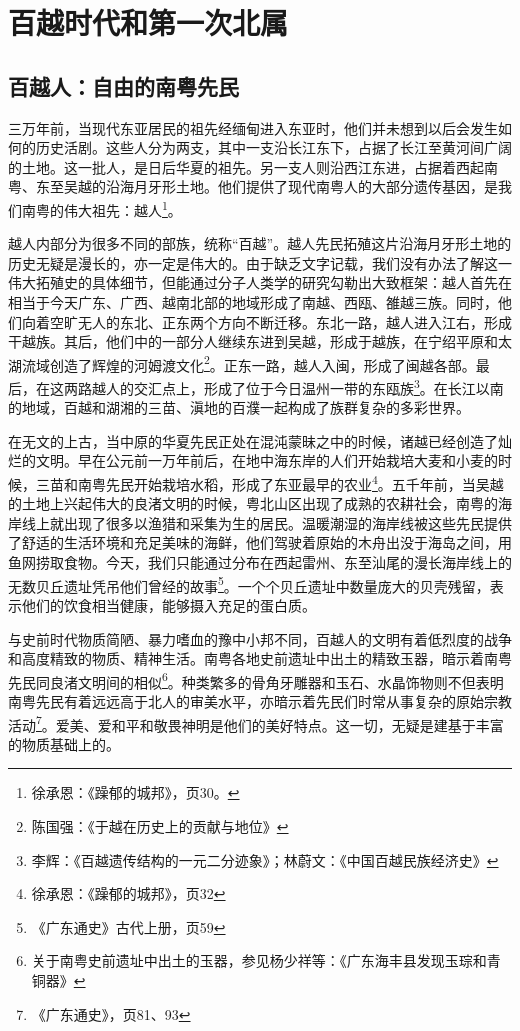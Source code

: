 \chapter{百越时代和第一次北属}

\section{百越人：自由的南粤先民}

三万年前，当现代东亚居民的祖先经缅甸进入东亚时，他们并未想到以后会发生如何的历史活剧。这些人分为两支，其中一支沿长江东下，占据了长江至黄河间广阔的土地。这一批人，是日后华夏的祖先。另一支人则沿西江东进，占据着西起南粤、东至吴越的沿海月牙形土地。他们提供了现代南粤人的大部分遗传基因，是我们南粤的伟大祖先：越人\footnote{徐承恩：《躁郁的城邦》，页30。}。

越人内部分为很多不同的部族，统称“百越”。越人先民拓殖这片沿海月牙形土地的历史无疑是漫长的，亦一定是伟大的。由于缺乏文字记载，我们没有办法了解这一伟大拓殖史的具体细节，但能通过分子人类学的研究勾勒出大致框架：越人首先在相当于今天广东、广西、越南北部的地域形成了南越、西瓯、雒越三族。同时，他们向着空旷无人的东北、正东两个方向不断迁移。东北一路，越人进入江右，形成干越族。其后，他们中的一部分人继续东进到吴越，形成于越族，在宁绍平原和太湖流域创造了辉煌的河姆渡文化\footnote{陈国强：《于越在历史上的贡献与地位》}。正东一路，越人入闽，形成了闽越各部。最后，在这两路越人的交汇点上，形成了位于今日温州一带的东瓯族\footnote{李辉：《百越遗传结构的一元二分迹象》；林蔚文：《中国百越民族经济史》}。在长江以南的地域，百越和湖湘的三苗、滇地的百濮一起构成了族群复杂的多彩世界。

在无文的上古，当中原的华夏先民正处在混沌蒙昧之中的时候，诸越已经创造了灿烂的文明。早在公元前一万年前后，在地中海东岸的人们开始栽培大麦和小麦的时候，三苗和南粤先民开始栽培水稻，形成了东亚最早的农业\footnote{徐承恩：《躁郁的城邦》，页32}。五千年前，当吴越的土地上兴起伟大的良渚文明的时候，粤北山区出现了成熟的农耕社会，南粤的海岸线上就出现了很多以渔猎和采集为生的居民。温暖潮湿的海岸线被这些先民提供了舒适的生活环境和充足美味的海鲜，他们驾驶着原始的木舟出没于海岛之间，用鱼网捞取食物。今天，我们只能通过分布在西起雷州、东至汕尾的漫长海岸线上的无数贝丘遗址凭吊他们曾经的故事\footnote{《广东通史》古代上册，页59}。一个个贝丘遗址中数量庞大的贝壳残留，表示他们的饮食相当健康，能够摄入充足的蛋白质。

与史前时代物质简陋、暴力嗜血的豫中小邦不同，百越人的文明有着低烈度的战争和高度精致的物质、精神生活。南粤各地史前遗址中出土的精致玉器，暗示着南粤先民同良渚文明间的相似\footnote{关于南粤史前遗址中出土的玉器，参见杨少祥等：《广东海丰县发现玉琮和青铜器》}。种类繁多的骨角牙雕器和玉石、水晶饰物则不但表明南粤先民有着远远高于北人的审美水平，亦暗示着先民们时常从事复杂的原始宗教活动\footnote{《广东通史》，页81、93}。爱美、爱和平和敬畏神明是他们的美好特点。这一切，无疑是建基于丰富的物质基础上的。

